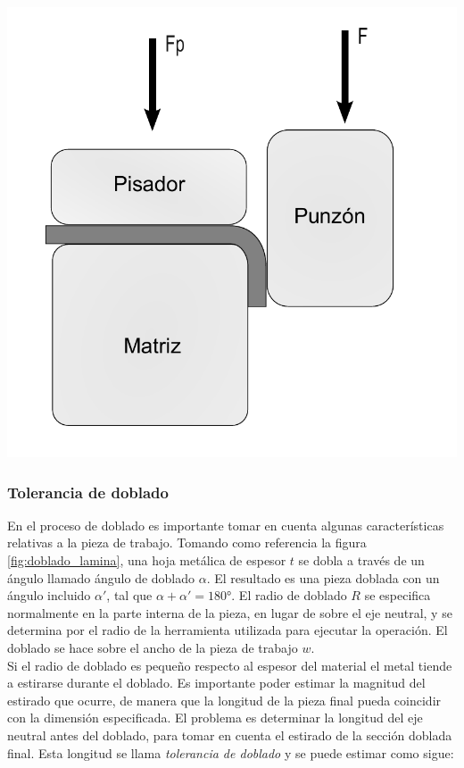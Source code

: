 \begin{center}
\includegraphics[scale=0.4]{src/ch2/doblado_bordes}
\label{fig:doblado_bordes}
\end{center}


\subsubsection{Tolerancia de doblado}

En el proceso de doblado es importante tomar en cuenta algunas características relativas a la 
pieza de trabajo. Tomando como referencia la figura \ref{fig:doblado_lamina}, una hoja metálica 
de espesor $t$ se dobla a través de un ángulo llamado ángulo de doblado $\alpha$. El  resultado 
es una pieza doblada con un ángulo incluido $\alpha'$, tal que $\alpha + \alpha' = 180°$. 
El radio de doblado $R$ se especifica normalmente en la parte interna de la pieza, en lugar de 
sobre el eje neutral, y se determina por el radio de la herramienta utilizada para ejecutar 
la operación. El doblado se hace sobre el ancho de la pieza de trabajo $w$. ~\cite{groover2007}\\

Si el radio de doblado es pequeño respecto al espesor del material el metal tiende a estirarse 
durante el doblado. Es importante poder estimar la magnitud del estirado que ocurre, de manera 
que la longitud de la pieza final pueda coincidir con la dimensión especificada. El problema 
es determinar la longitud del eje neutral antes del doblado, para tomar en cuenta el estirado 
de la sección doblada final. Esta longitud se llama \textit{tolerancia de doblado} y se puede 
estimar como sigue: ~\cite{groover2007}

